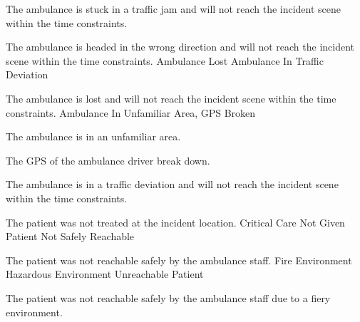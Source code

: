   \startkaosspec
  	 {The ambulance is stuck in a traffic jam and will not reach the incident scene within the time constraints.}
  \stopkaosspec
  
  \startkaosspec
  	 {The ambulance is headed in the wrong direction and will not reach the incident scene within the time constraints.}
  	 {Ambulance Lost}
  	 {Ambulance In Traffic Deviation}
  \stopkaosspec
  
  \startkaosspec
  	 {The ambulance is lost and will not reach the incident scene within the time constraints.}
  	 {Ambulance In Unfamiliar Area, GPS Broken}
  \stopkaosspec
  
  \startkaosspec
  	 {The ambulance is in an unfamiliar area.}
  \stopkaosspec
  
  \startkaosspec
  	 {The GPS of the ambulance driver break down.}
  \stopkaosspec
  
  \startkaosspec
  	 {The ambulance is in a traffic deviation and will not reach the incident scene within the time constraints.}
  \stopkaosspec
  
  
    {}
  
  \startkaosspec
  	 {The patient was not treated at the incident location.}
  	 {Critical Care Not Given}
  	 {Patient Not Safely Reachable}
  \stopkaosspec
  
  \startkaosspec
  	 {The patient was not reachable safely by the ambulance staff.}
  	 {Fire Environment}
  	 {Hazardous Environment}
  	 {Unreachable Patient}
  \stopkaosspec
  
  \startkaosspec
  	 {The patient was not reachable safely by the ambulance staff due to a fiery environment.}
  \stopkaosspec
  
